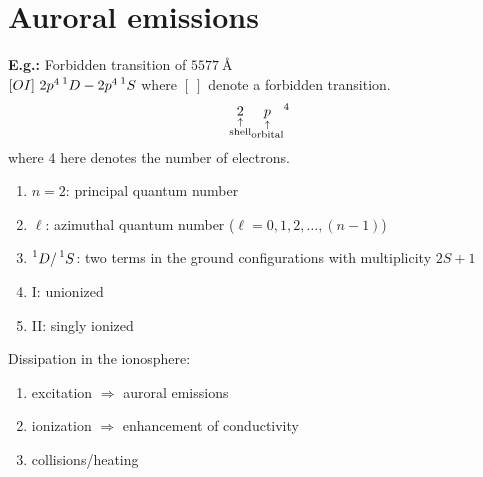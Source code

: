 \section{Auroral emissions}
\textbf{E.g.:} Forbidden transition of \(\SI{5577}{\angstrom}\) \\
\([OI]~2p^4\prescript{1}{}{D}-2p^4\prescript{1}{}{S}\) where \([~]\) denote a forbidden transition.
\begin{equation*}
    \underset{\substack{\uparrow \\ \textnormal{shell}}}{2}\underset{\substack{\uparrow \\ \textnormal{orbital}}}{p}^4
\end{equation*}
where \(4\) here denotes the number of electrons.
\begin{enumerate}[\(\bullet \)]
    \item \(n=2\): principal quantum number
    \item \(\ell \): azimuthal quantum number (\(\ell=0, 1, 2, \ldots , (n-1)\))
    \item \(\prescript{1}{}{D}/\prescript{1}{}{S}\): two terms in the ground configurations with multiplicity \(2S+1\)
    \item I\@: unionized
    \item II\@: singly ionized
\end{enumerate}
Dissipation in the ionosphere: \begin{enumerate}
    \item excitation \(\Rightarrow \) auroral emissions
    \item ionization \(\Rightarrow \) enhancement of conductivity
    \item collisions/heating
\end{enumerate}


